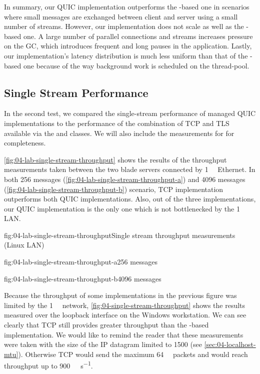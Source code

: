 In summary, our QUIC implementation outperforms the \libmsquic{}-based one in scenarios where small
messages are exchanged between client and server using a small number of streams. However, our
implementation does not scale as well as the \libmsquic-based one. A large number of parallel
connections and streams increases pressure on the GC, which introduces frequent and long pauses in
the application. Lastly, our implementation's latency distribution is much less uniform than that of
the \libmsquic{}-based one because of the way background work is scheduled on the \dotnet{}
thread-pool.

\subsection{Single Stream Performance}

In the second test, we compared the single-stream performance of managed QUIC implementations to the
performance of the combination of TCP and TLS available via the \TcpClient{} and \SslStream{}
\dotnet{} classes. We will also include the measurements for \libmsquic{} for completeness.

\autoref{fig:04-lab-single-stream-throughput} shows the results of the throughput measurements taken
between the two blade servers connected by \SI{1}{\giga\bit} Ethernet. In both \SI{256}{\byte}
messages (\autoref{fig:04-lab-single-stream-throughput-a}) and \SI{4096}{\byte} messages
(\autoref{fig:04-lab-single-stream-throughput-b}) scenario, TCP implementation outperforms both QUIC
implementations. Also, out of the three implementations, our QUIC implementation is the only one
which is not bottlenecked by the \SI{1}{\giga\bit} LAN\@.

\begin{myFigure}{fig:04-lab-single-stream-throughput}{Single stream throughput measurements (Linux LAN)}
\begin{mySubfigure}{0.49\linewidth}{fig:04-lab-single-stream-throughput-a}{\SI{256}{\byte} messages}
\footnotesize

\end{mySubfigure}
\begin{mySubfigure}{0.49\linewidth}{fig:04-lab-single-stream-throughput-b}{\SI{4096}{\byte} messages}
\footnotesize

\end{mySubfigure}
\end{myFigure}

Because the throughput of some implementations in the previous figure was limited by the
\SI{1}{\giga\bit} network, \autoref{fig:04-single-stream-throughput} shows the results measured over
the loopback interface on the Windows workstation. We can see clearly that TCP still provides
greater throughput than the \libmsquic{}-based implementation. We would like to remind the reader
that these measurements were taken with the size of the IP datagram limited to \SI{1500}{\byte} (see
\autoref{sec:04-localhost-mtu}). Otherwise TCP would send the maximum \SI{64}{\kibi\byte} packets
and would reach throughput up to \SI[per-mode=symbol]{900}{\mebi\byte\per\second}.

